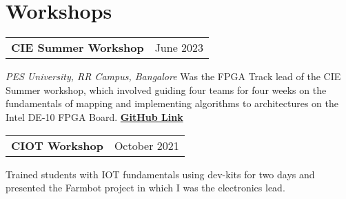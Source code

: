\section{\sc Workshops}

\begin{tabular}{@{}p{4in}p{2in}}                                                                                                                 
  {\bf{CIE Summer Workshop}}  & June 2023   \\                                                                                    
\end{tabular}                                                                                                                                    
\textit{PES University, RR Campus, Bangalore}
Was the FPGA Track lead of the CIE Summer workshop, which involved guiding four teams for four weeks on the fundamentals of mapping and implementing algorithms to architectures on the Intel DE-10 FPGA Board. \href{https://github.com/CIE-PESU/DE10_FPGA}{{\bf{GitHub Link}}}

\begin{tabular}{@{}p{4in}p{2in}}                                                                                                                 
  {\bf{CIOT Workshop}}  & October 2021   \\                                                                                    
\end{tabular}                                                                                                                                    
Trained students with IOT fundamentals using dev-kits for two days and presented the Farmbot project in which I was the electronics lead.    
\endinput
